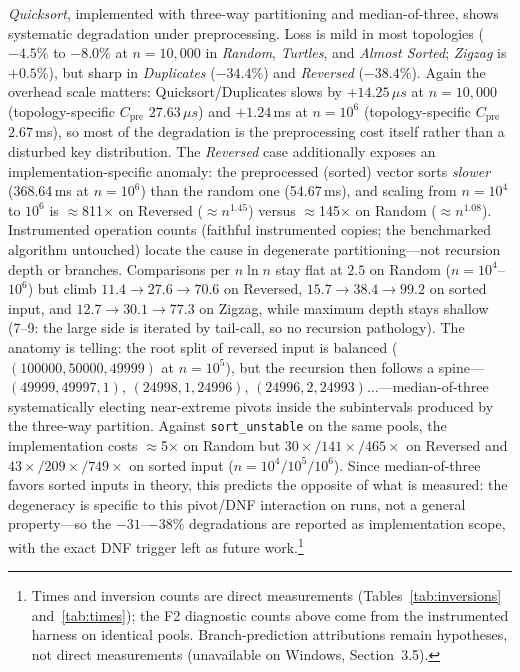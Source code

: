 \documentclass[namedate,webpdf,contemporary,large]{TBench-template}%
\theoremstyle{thmstyleone}%
\theoremstyle{thmstyletwo}%
\theoremstyle{thmstylethree}%
\begin{document}
\emph{Quicksort}, implemented with three-way partitioning and median-of-three, shows systematic degradation under preprocessing. Loss is mild in most topologies ($-4.5\%$ to $-8.0\%$ at $n{=}10{,}000$ in \emph{Random}, \emph{Turtles}, and \emph{Almost Sorted}; \emph{Zigzag} is $+0.5\%$), but sharp in \emph{Duplicates} ($-34.4\%$) and \emph{Reversed} ($-38.4\%$). Again the overhead scale matters: Quicksort/Duplicates slows by $+14.25\,\mu s$ at $n{=}10{,}000$ (topology-specific $C_{\text{pre}}$ $27.63\,\mu s$) and $+1.24$\,ms at $n{=}10^6$ (topology-specific $C_{\text{pre}}$ $2.67$\,ms), so most of the degradation is the preprocessing cost itself rather than a disturbed key distribution. The \emph{Reversed} case additionally exposes an implementation-specific anomaly: the preprocessed (sorted) vector sorts \emph{slower} (368.64\,ms at $n{=}10^6$) than the random one (54.67\,ms), and scaling from $n{=}10^4$ to $10^6$ is $\approx$811$\times$ on Reversed ($\approx n^{1.45}$) versus $\approx$145$\times$ on Random ($\approx n^{1.08}$). Instrumented operation counts (faithful instrumented copies; the benchmarked algorithm untouched) locate the cause in degenerate partitioning---not recursion depth or branches. Comparisons per $n\ln n$ stay flat at $2.5$ on Random ($n{=}10^4$--$10^6$) but climb $11.4{\to}27.6{\to}70.6$ on Reversed, $15.7{\to}38.4{\to}99.2$ on sorted input, and $12.7{\to}30.1{\to}77.3$ on Zigzag, while maximum depth stays shallow (7--9: the large side is iterated by tail-call, so no recursion pathology). The anatomy is telling: the root split of reversed input is balanced ($(100000,50000,49999)$ at $n{=}10^5$), but the recursion then follows a spine---$(49999,49997,1)$, $(24998,1,24996)$, $(24996,2,24993)\ldots$---median-of-three systematically electing near-extreme pivots inside the subintervals produced by the three-way partition. Against \texttt{sort\_unstable} on the same pools, the implementation costs $\approx$5$\times$ on Random but $30{\times}/141{\times}/465{\times}$ on Reversed and $43{\times}/209{\times}/749{\times}$ on sorted input ($n{=}10^4/10^5/10^6$). Since median-of-three favors sorted inputs in theory, this predicts the opposite of what is measured: the degeneracy is specific to this pivot/DNF interaction on runs, not a general property---so the $-31$--$-38\%$ degradations are reported as implementation scope, with the exact DNF trigger left as future work.\footnote{Times and inversion counts are direct measurements (Tables~\ref{tab:inversions} and~\ref{tab:times}); the F2 diagnostic counts above come from the instrumented harness on identical pools. Branch-prediction attributions remain hypotheses, not direct measurements (unavailable on Windows, Section~3.5).}
\end{document}

